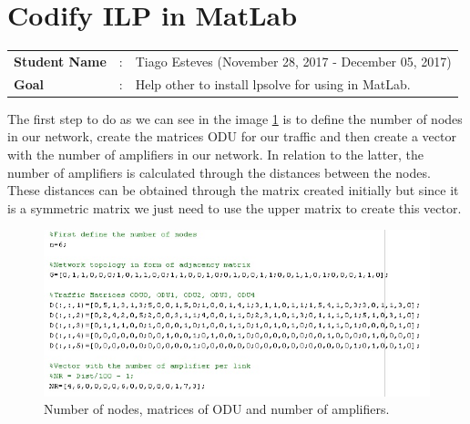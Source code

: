 \clearpage

\section{Codify ILP in MatLab}
\begin{tcolorbox}	
\begin{tabular}{p{2.75cm} p{0.2cm} p{10.5cm}} 	
\textbf{Student Name}  &:& Tiago Esteves        (November 28, 2017 - December 05, 2017)\\
\textbf{Goal}          &:& Help other to install lpsolve for using in MatLab.
\end{tabular}
\end{tcolorbox}
\vspace{17pt}

The first step to do as we can see in the image \ref{first_step} is to define the number of nodes in our network, create the matrices ODU for our traffic and then create a vector with the number of amplifiers in our network. In relation to the latter, the number of amplifiers is calculated through the distances between the nodes. These distances can be obtained through the matrix created initially but since it is a symmetric matrix we just need to use the upper matrix to create this vector.\\

\begin{figure}[h!]
\centering
\includegraphics[width=\textwidth]{appendices/lpsolve/figures/first_step}
\caption{Number of nodes, matrices of ODU and number of amplifiers.}
\label{first_step}
\end{figure}

